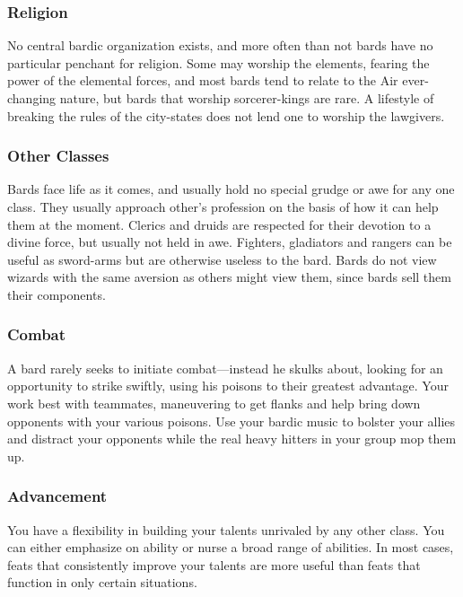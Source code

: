 \subsubsection{Religion}

No central bardic organization exists, and more often than not bards have no particular penchant for religion. Some may worship the elements, fearing the power of the elemental forces, and most bards tend to relate to the Air ever-changing nature, but bards that worship sorcerer-kings are rare. A lifestyle of breaking the rules of the city-states does not lend one to worship the lawgivers.

\subsubsection{Other Classes}

Bards face life as it comes, and usually hold no special grudge or awe for any one class. They usually approach other's profession on the basis of how it can help them at the moment. Clerics and druids are respected for their devotion to a divine force, but usually not held in awe. Fighters, gladiators and rangers can be useful as sword-arms but are otherwise useless to the bard. Bards do not view wizards with the same aversion as others might view them, since bards sell them their components.

\subsubsection{Combat}

A bard rarely seeks to initiate combat---instead he skulks about, looking for an opportunity to strike swiftly, using his poisons to their greatest advantage. Your work best with teammates, maneuvering to get flanks and help bring down opponents with your various poisons. Use your bardic music to bolster your allies and distract your opponents while the real heavy hitters in your group mop them up.

\subsubsection{Advancement}

You have a flexibility in building your talents unrivaled by any other class. You can either emphasize on ability or nurse a broad range of abilities. In most cases, feats that consistently improve your talents are more useful than feats that function in only certain situations.

